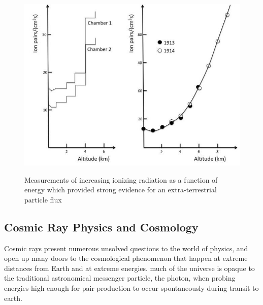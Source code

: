 \begin{figure}
\begin{centering}
\label{fig:HessKol}
	\includegraphics[width=\textwidth]{figures/HessKol}
	\caption{Measurements of increasing ionizing radiation as a function of energy which provided strong evidence for an extra-terrestrial particle flux \cite{HessKolPic} }
\end{centering}
\end{figure}
	
	\subsection{Cosmic Ray Physics and Cosmology}
	Cosmic rays present numerous unsolved questions to the world of physics, and open up many doors to the cosmological phenomenon that happen at extreme distances from Earth and at extreme energies.  much of the universe is opaque to the traditional astronomical messenger particle, the photon, when probing energies high enough for pair production to occur spontaneously during transit to earth.     

